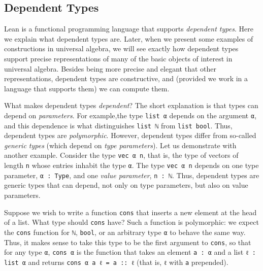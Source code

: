 \documentclass[11pt]{amsart}  %
\begin{document}

\subsection{Dependent Types}
Lean is a functional programming language that supports \emph{dependent types}.
Here we explain what dependent types are.  Later, when we present some 
examples of constructions in universal algebra, we will see exactly how dependent types support precise representations of many of the basic objects of interest in universal algebra.
Besides being more precise and elegant that other representations, dependent types are constructive, and (provided we work in a language that supports them) we can compute them.

What makes dependent types \emph{dependent}? %
The short explanation is that types can depend on \emph{parameters}. For example,the type \lstinline{list α} depends on the argument \lstinline{α}, and this dependence is what distinguishes \lstinline{list ℕ} from \lstinline{list bool}. Thus, dependent types are \emph{polymorphic}.  However, dependent types differ from so-called \emph{generic types} (which depend on \emph{type parameters}).  Let us demonstrate with another example.  
Consider the type \lstinline{vec α n}, that is, the type of vectors of length 
\lstinline{n} whose entries inhabit the type \lstinline{α}. The type \lstinline{vec α n} depends on one type parameter, \lstinline{α : Type}, and one \emph{value parameter}, \lstinline{n : ℕ}.  Thus, dependent types are generic types that can depend, not only on type parameters, but also on value parameters.

Suppose we wish to write a function \lstinline{cons} that inserts a new element at the head of a list. What type should \lstinline{cons} have? Such a function is polymorphic: we expect the \lstinline{cons} function for \lstinline{ℕ}, \lstinline{bool}, or an arbitrary type \lstinline{α} to behave the same way. Thus, it makes sense to take this type to be the first argument to \lstinline{cons}, so that for any type \lstinline{α}, \lstinline{cons α} is the function that takes an element \lstinline{a : α} and a list 
\lstinline{ℓ : list α} and returns \lstinline{cons α a ℓ = a :: ℓ} 
(that is, \lstinline{ℓ} with \lstinline{a} prepended).
\end{document}
